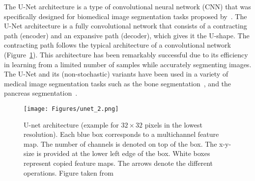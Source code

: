 \label{sec:unet}
The U-Net architecture is a type of convolutional neural network (CNN) that was
specifically designed for biomedical image segmentation tasks
proposed by~\cite{ronneberger2015u}.
The U-Net architecture is a fully convolutional network that consists of a contracting path (encoder)
and an expansive path (decoder), which gives it the U-shape.
The contracting path follows the typical architecture of a convolutional network 
(Figure~\ref{fig:unet}).
This architecture has been remarkably successful due to its efficiency in
learning from a limited number of samples while accurately segmenting images.
The U-Net and its (non-stochastic) variants have been used in a variety of
medical image segmentation tasks such as the bone 
segmentation~\citep{caron2023segmentation, ganeshaaraj2022semantic}, and
the pancreas segmentation~\citep{sriram2020multilevel}.
\begin{figure}[htb!]
    \centering
    \texttt{[image: Figures/unet\_2.png]}
    \caption{U-net architecture (example for $32\times32$ pixels in the lowest
    resolution). Each blue box corresponds to a multichannel feature map. The
    number of channels is denoted on top of the box. The x-y-size is provided at
    the lower left edge of the box. White boxes represent copied feature maps.
    The arrows denote the different operations.
    Figure taken from~\citep{ronneberger2015u}}
    \label{fig:unet}
\end{figure}

